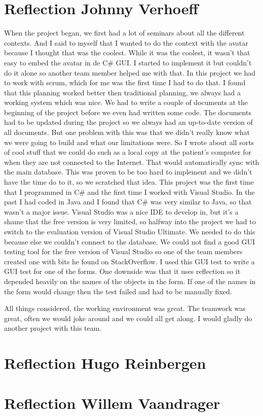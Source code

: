 \section{Reflection Johnny Verhoeff}
When the project began, we first had a lot of seminars about all the different contexts. And I said to myself that I wanted to do the context with the avatar because I thought that was the coolest. While it was the coolest, it wasn't that easy to embed the avatar in de C\# GUI. I started to implement it but couldn't do it alone so another team member helped me with that. In this project we had to work with scrum, which for me was the first time I had to do that. I found that this planning worked better then traditional planning, we always had a working system which was nice. 
We had to write a couple of documents at the beginning of the project before we even had written some code. The documents had to be updated during the project so we always had an up-to-date version of all documents. But one problem with this was that we didn't really know what we were going to build and what our limitations were. So I wrote about all sorts of cool stuff that we could do such as a local copy at the patient's computer for when they are not connected to the Internet. That would automatically sync with the main database. This was proven to be too hard to implement and we didn't have the time do to it, so we scratched that idea. 
This project was the first time that I programmed in C\# and the first time I worked with Visual Studio.  In the past I had coded in Java and I found that C\# was very similar to Java, so that wasn't a major issue. Visual Studio was a nice IDE to develop in, but it's a shame that the free version is very limited, so halfway into the project we had to switch to the evaluation version of Visual Studio Ultimate. We needed to do this because else we couldn't connect to the database.
We could not find a good GUI testing tool for the free version of Visual Studio so one of the team members created one with bits he found on StackOverflow. I used this GUI test to write a GUI test for one of the forms.  One downside was that it uses reflection so it depended heavily on the names of the objects in the form. If one of the names in the form would change then the test failed and had to be manually fixed.

All things considered, the working environment was great. The teamwork was great, often we would joke around and we could all get along.
I would gladly do another project with this team.

\section{Reflection Hugo Reinbergen}

\section{Reflection Willem Vaandrager}
